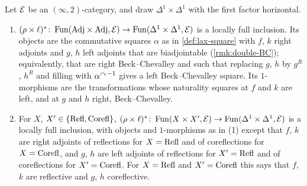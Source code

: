 \begin{lem}
\label{lem:biadjointable}
%
Let $\mathcal{E}$ be an $(\infty,2)$-category, and draw
$\Delta^{1} \times \Delta^{1}$
with the first factor horizontal.
\begin{enumerate}
\item
$(\rho \times \ell)^{*}\colon \operatorname{Fun}(\mathrm{Adj} \times \mathrm{Adj},\mathcal{E}) \to
\operatorname{Fun}(\Delta^{1} \times \Delta^{1},\mathcal{E})$
is a locally full inclusion. Its objects are the commutative squares $\alpha$ as
in \cref{def:lax-square} with $f$, $k$ right adjoints and $g$, $h$ left adjoints
that are biadjointable (\cref{rmk:double-BC}); equivalently,
that are right Beck--Chevalley and such
that replacing $g$, $h$ by $g^{R}$, $h^{R}$ and filling with
${{\alpha}^{\curvearrowright}}^{-1}$
gives a left Beck--Chevalley square. Its $1$-morphisms are the transformations
whose naturality squares at $f$ and $k$ are left, and at $g$ and $h$ right,
Beck--Chevalley.
\item For
$X$,
$X' \in \{\mathrm{Refl},\mathrm{Corefl}\}$,
$(\rho \times \ell)^{*}\colon \operatorname{Fun}(X \times X',\mathcal{E}) \to
\operatorname{Fun}(\Delta^{1} \times \Delta^{1},\mathcal{E})$
is a locally full inclusion, with objects and $1$-morphisms as in (1) except
that $f$, $k$ are right adjoints of reflections for $X = \mathrm{Refl}$ and of
coreflections for $X = \mathrm{Corefl}$, and $g$, $h$ are left adjoints of reflections
for $X' = \mathrm{Refl}$ and of coreflections for $X' = \mathrm{Corefl}$.
For $X = \mathrm{Refl}$ and $X' = \mathrm{Corefl}$ this says that $f$, $k$ are reflective and
$g$, $h$ coreflective.
\end{enumerate}
\end{lem}

